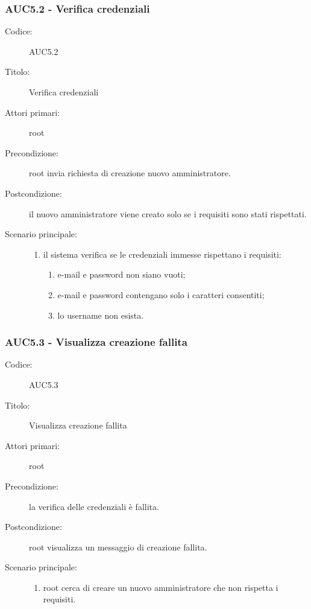 \documentclass[casi-duso]{subfiles}
\begin{document}
\subsubsection{AUC5.2 - Verifica credenziali}%
\label{subsub:AUC5.2}
\begin{description}
  \item[Codice:] AUC5.2
  \item[Titolo:] Verifica credenziali
  \item[Attori primari:] root
  \item[Precondizione:] root invia richiesta di creazione nuovo amministratore.
  \item[Postcondizione:] il nuovo amministratore viene creato solo se i requisiti sono stati rispettati.
  \item[Scenario principale:]
  \begin{enumerate}
    \item il sistema verifica se le credenziali immesse rispettano i requisiti:
    \begin{enumerate}
      \item e-mail e password non siano vuoti;
      \item e-mail e password contengano solo i caratteri consentiti;
      \item lo username non esista.
    \end{enumerate}
  \end{enumerate}
\end{description}

\subsubsection{AUC5.3 - Visualizza creazione fallita}%
\label{subsub:AUC5.3}
\begin{description}
  \item[Codice:] AUC5.3
  \item[Titolo:] Visualizza creazione fallita
  \item[Attori primari:] root
  \item[Precondizione:] la verifica delle credenziali è fallita.
  \item[Postcondizione:] root visualizza un messaggio di creazione fallita.
  \item[Scenario principale:]
  \begin{enumerate}
    \item root cerca di creare un nuovo amministratore che non rispetta i requisiti.
  \end{enumerate}
\end{description}
\end{document}
